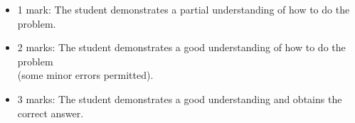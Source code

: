 \documentclass{article}
\begin{document}
            \begin{small}
            \begin{itemize}
            \item 1 mark: The student demonstrates a partial understanding of how to do the problem.
            \item 2 marks: The student demonstrates a good understanding of how to do the problem \\ (some minor errors permitted).
            \item 3 marks: The student demonstrates a good understanding and obtains the correct answer.
            \end{itemize}
            \end{small}
\end{document}
